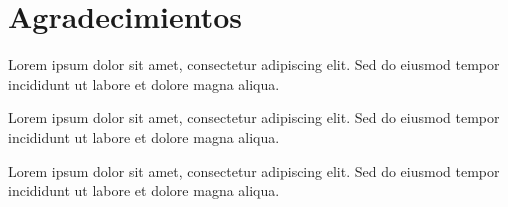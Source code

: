 \chapter*{Agradecimientos}
Lorem ipsum dolor sit amet, consectetur adipiscing elit. Sed do eiusmod tempor incididunt ut labore et dolore magna aliqua.


Lorem ipsum dolor sit amet, consectetur adipiscing elit. Sed do eiusmod tempor incididunt ut labore et dolore magna aliqua.


Lorem ipsum dolor sit amet, consectetur adipiscing elit. Sed do eiusmod tempor incididunt ut labore et dolore magna aliqua.
